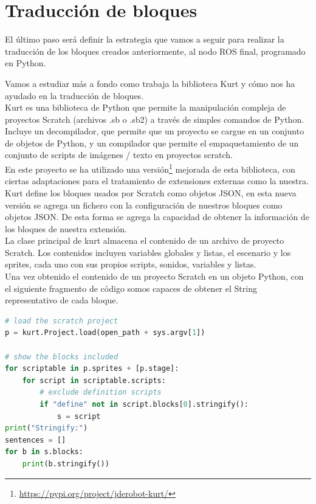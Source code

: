 \section{Traducción de bloques}
El último paso será definir la estrategia que vamos a seguir para realizar la traducción de los bloques creados anteriormente, al nodo ROS final, programado en Python.

Vamos a estudiar más a fondo como trabaja la biblioteca Kurt y cómo nos ha ayudado en la traducción de bloques.\\

Kurt es una biblioteca de Python que permite la manipulación compleja de proyectos Scratch (archivos .sb o .sb2) a través de simples comandos de Python. Incluye un decompilador, que permite que un proyecto se cargue en un conjunto de objetos de Python, y un compilador que permite el empaquetamiento de un conjunto de scripts de imágenes / texto en proyectos scratch.\\

En este proyecto se ha utilizado una versión\footnote{\url{https://pypi.org/project/jderobot-kurt/}} mejorada de esta biblioteca, con ciertas adaptaciones para el tratamiento de extensiones externas como la nuestra. Kurt define los bloques usados por Scratch como objetos JSON, en esta nueva versión se agrega un fichero con la configuración de nuestros bloques como objetos JSON. De esta forma se agrega la capacidad de obtener la información de los bloques de nuestra extensión.\\

La clase principal de kurt almacena el contenido de un archivo de proyecto Scratch.
Los contenidos incluyen variables globales y listas, el escenario y los sprites, cada uno con sus propios scripts, sonidos, variables y listas.\\

Una vez obtenido el contenido de un proyecto Scratch en un objeto Python, con el siguiente fragmento de código somos capaces de obtener el String representativo de cada bloque.\\

\begin{lstlisting}[language=python,firstnumber=1]
# load the scratch project
p = kurt.Project.load(open_path + sys.argv[1])

# show the blocks included
for scriptable in p.sprites + [p.stage]:
	for script in scriptable.scripts:
		# exclude definition scripts
		if "define" not in script.blocks[0].stringify():
			s = script
print("Stringify:")
sentences = []
for b in s.blocks:
	print(b.stringify())
\end{lstlisting}

